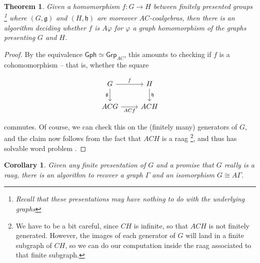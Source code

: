 \documentclass[microtype]{gtpart}
\newtheorem{thm}{Theorem}
\newtheorem{cor}{Corollary}
\theoremstyle{definition}
\theoremstyle{theorem}
\newcommand*{\catFont}[1]{\mathsf{#1}}
\newcommand{\Grp}{\catFont{Grp}}
\begin{document}
\begin{thm}
  Given a homomorphism $f : G \to H$ between finitely presented groups%
  \footnote{Recall that these presentations may have nothing to do with the 
  underlying graphs} where $(G,\mathfrak{g})$ and $(H,\mathfrak{h})$ are 
  moreover $AC$-coalgebras, then there is an algorithm deciding 
  whether $f$ is $A \varphi$ for $\varphi$ a graph homomorphism of the graphs 
  presenting $G$ and $H$.
\end{thm}

\begin{proof}
    By the equivalence $\mathsf{Gph} \simeq \Grp_{AC}$, this amounts to 
    checking if $f$ is a cohomomorphism -- that is, whether the square

    \setlength\mathsurround{0pt}
    \[
        \begin{tikzcd}
            G & H \\
            ACG & ACH
            \arrow["f", from=1-1, to=1-2]
            \arrow["\mathfrak{g}"', from=1-1, to=2-1]
            \arrow["ACf"', from=2-1, to=2-2]
            \arrow["\mathfrak{h}", from=1-2, to=2-2]
        \end{tikzcd}
    \]
    \setlength\mathsurround{0.8pt}

    commutes. Of course, we can check this on the (finitely many) generators
    of $G$, 
    and the claim now follows from the fact that $ACH$ is a raag%
    \footnote{We have to be a bit careful, since $CH$ is infinite, so that 
    $ACH$ is not finitely generated. However, the images of each generator 
    of $G$ will land in a finite subgraph of $CH$, so we can do our 
    computation inside the raag associated to that finite subgraph.}, and thus
    has solvable word problem \cite{charneyIntroductionRightangledArtin2007}.
\end{proof}

\begin{cor}\label{cor:recover-graph}
  Given \emph{any} finite presentation of $G$ and a promise that $G$ really 
  is a raag, there is an algorithm to recover a graph $\Gamma$ and an 
  isomorphism $G \cong A \Gamma$.
\end{cor}
\end{document}
